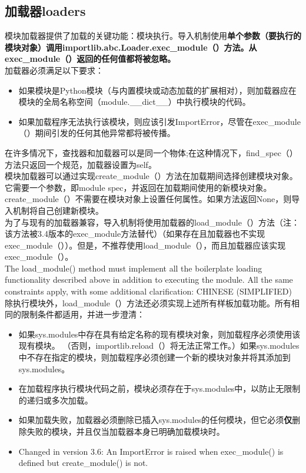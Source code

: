 \documentclass[10pt,UTF8]{ctexart}
\begin{document}
\subsection{加载器loaders}
模块加载器提供了加载的关键功能：模块执行。导入机制使用\textbf{单个参数（要执行的模块对象）调用importlib.abc.Loader.exec_module（）方法。从exec_module（）返回的任何值都将被忽略。}\\
\indent 加载器必须满足以下要求：
\begin{itemize}
\item 如果模块是Python模块（与内置模块或动态加载的扩展相对），则加载器应在模块的全局名称空间（module.__dict__）中执行模块的代码。
\item 如果加载程序无法执行该模块，则应该引发ImportError，尽管在exec_module（）期间引发的任何其他异常都将被传播。
\end{itemize}
在许多情况下，查找器和加载器可以是同一个物体;在这种情况下，find_spec（）方法只返回一个规范，加载器设置为self。\\
\indent 模块加载器可以通过实现create_module（）方法在加载期间选择创建模块对象。它需要一个参数，即module spec，并返回在加载期间使用的新模块对象。 create_module（）不需要在模块对象上设置任何属性。如果方法返回None，则导入机制将自己创建新模块。\\
\indent 为了与现有的加载器兼容，导入机制将使用加载器的load_module（）方法（注：该方法被3.4版本的exec_module方法替代）（如果存在且加载器也不实现exec_module（））。但是，不推荐使用load_module（），而且加载器应该实现exec_module（）。\\
\indent The load_module() method must implement all the boilerplate loading functionality described above in addition to executing the module. All the same constraints apply, with some additional clarification:
CHINESE (SIMPLIFIED)
除执行模块外，load_module（）方法还必须实现上述所有样板加载功能。所有相同的限制条件都适用，并进一步澄清：
\begin{itemize}
\item 如果sys.modules中存在具有给定名称的现有模块对象，则加载程序必须使用该现有模块。 （否则，importlib.reload（）将无法正常工作。）如果sys.modules中不存在指定的模块，则加载程序必须创建一个新的模块对象并将其添加到sys.modules。
\item 在加载程序执行模块代码之前，模块必须存在于sys.modules中，以防止无限制的递归或多次加载。
\item 如果加载失败，加载器必须删除已插入sys.modules的任何模块，但它必须\textbf{仅}删除失败的模块，并且仅当加载器本身已明确加载模块时。
\item Changed in version 3.6: An ImportError is raised when exec_module() is defined but create_module() is not.
\end{itemize}
\end{document}
